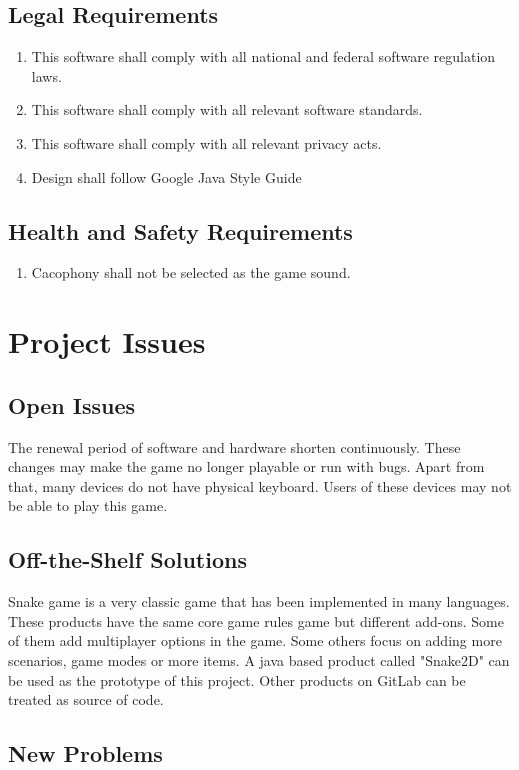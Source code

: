 \documentclass[12pt, titlepage]{article}
\begin{document}
\subsection{Legal Requirements}
\begin{enumerate}[{LR}1. ]
	    \item This software shall comply with all national and federal software regulation laws.
        \item This software shall comply with all relevant software standards.
        \item This software shall comply with all relevant privacy acts.
        \item Design shall follow Google Java Style Guide
\end{enumerate}
\subsection{Health and Safety Requirements}
\begin{enumerate}[{HS}1. ]
	    \item Cacophony shall not be selected as the game sound.
\end{enumerate}


\section{Project Issues}

\subsection{Open Issues}
    The renewal period of software and hardware shorten continuously. These changes may make the game no longer playable or run with bugs. Apart from that, many devices do not have physical keyboard. Users of these devices may not be able to play this game.
\subsection{Off-the-Shelf Solutions}
    Snake game is a very classic game that has been implemented in many languages. These products have the same core game rules game but different add-ons. Some of them add multiplayer options in the game. Some others focus on adding more scenarios, game modes or more items. A java based product called "Snake2D" can be used as the prototype of this project. Other products on GitLab can be treated as source of code.
\subsection{New Problems}
\end{document}
